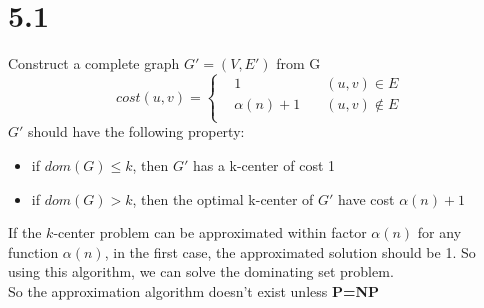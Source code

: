 \documentclass[12pt]{article}
\def\a{\alpha}\def\b{\beta}\def\d{\delta}\def\D{\Delta}\def\fs{\footnotesize}
\begin{document}
\section*{5.1}
Construct a complete graph $G'=(V, E')$ from G\\
$$
cost(u,v)=\left\{
\begin{aligned}
&1 &(u,v) \in E \\
&\alpha(n)+1 \quad &(u,v)\not\in E\\
\end{aligned}
\right.
$$
$G'$ should have the following property:
\begin{itemize}
\item
if $dom(G)\leq k$, then $G'$ has a k-center of cost 1
\item
if $dom(G)> k$, then the optimal k-center of $G'$ have cost $\alpha(n)+1$
\end{itemize}

If the $k$-center problem can be approximated within factor $\a(n)$ for any function $\a(n)$, in the first case, the approximated solution should be 1. So using this algorithm, we can solve the dominating set problem.\\
So the approximation algorithm doesn't exist unless \textbf{P=NP}
\end{document}
